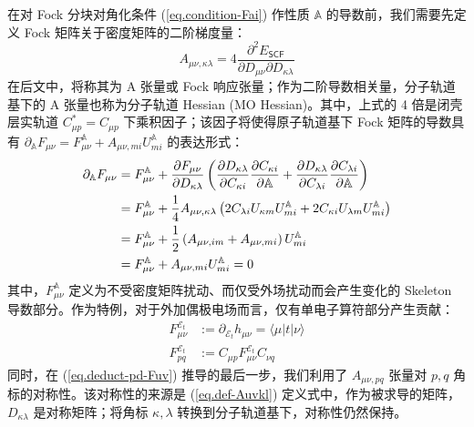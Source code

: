在对 Fock 分块对角化条件 (\ref{eq.condition-Fai}) 作性质 $\mathbb{A}$ 的导数前，我们需要先定义 Fock 矩阵关于密度矩阵的二阶梯度量：
\begin{equation}
  \label{eq.def-Auvkl}
  A_{\mu \nu, \kappa \lambda} = 4 \frac{\partial^2 E_\textsf{SCF}}{\partial D_{\mu \nu} \partial D_{\kappa \lambda}}
\end{equation}
在后文中，将称其为 A 张量或 Fock 响应张量；作为二阶导数相关量，分子轨道基下的 A 张量也称为分子轨道 Hessian (MO Hessian)。其中，上式的 4 倍是闭壳层实轨道 $C_{\mu p}^* = C_{\mu p}$ 下乘积因子；该因子将使得原子轨道基下 Fock 矩阵的导数具有 $\partial_\mathbb{A} F_{\mu \nu} = F_{\mu \nu}^\mathbb{A} + A_{\mu \nu, mi} U_{mi}^\mathbb{A}$ 的表达形式：
\begin{align}
  \label{eq.deduct-pd-Fuv}
  \partial_\mathbb{A} F_{\mu \nu} &= F_{\mu \nu}^\mathbb{A} + \frac{\partial F_{\mu \nu}}{\partial D_{\kappa \lambda}} \left( \frac{\partial D_{\kappa \lambda}}{\partial C_{\kappa i}} \frac{\partial C_{\kappa i}}{\partial \mathbb{A}} + \frac{\partial D_{\kappa \lambda}}{\partial C_{\lambda i}} \frac{\partial C_{\lambda i}}{\partial \mathbb{A}} \right) \notag\\
  &= F_{\mu \nu}^\mathbb{A} + \frac{1}{4} A_{\mu \nu, \kappa \lambda} \left( 2 C_{\lambda i} U_{\kappa m} U_{mi}^\mathbb{A} + 2 C_{\kappa i} U_{\lambda m} U_{mi}^\mathbb{A} \right) \notag\\
  &= F_{\mu \nu}^\mathbb{A} + \frac{1}{2} \left( A_{\mu \nu, im} + A_{\mu \nu, mi} \right) U_{mi}^\mathbb{A} \notag\\
  &= F_{\mu \nu}^\mathbb{A} + A_{\mu \nu, mi} U_{mi}^\mathbb{A} = 0
\end{align}
其中，$F_{\mu \nu}^\mathbb{A}$ 定义为不受密度矩阵扰动、而仅受外场扰动而会产生变化的 Skeleton 导数部分。作为特例，对于外加偶极电场而言，仅有单电子算符部分产生贡献：
\begin{align}
  F_{\mu \nu}^{\mathcal{E}_t} &:= \partial_{\mathcal{E}_t} h_{\mu \nu} = \langle \mu | t | \nu \rangle \\
  F_{pq}^{\mathcal{E}_t} &:= C_{\mu p} F_{\mu \nu}^{\mathcal{E}_t} C_{\nu q}
\end{align}
同时，在 (\ref{eq.deduct-pd-Fuv}) 推导的最后一步，我们利用了 $A_{\mu \nu, pq}$ 张量对 $p, q$ 角标的对称性。该对称性的来源是 (\ref{eq.def-Auvkl}) 定义式中，作为被求导的矩阵，$D_{\kappa \lambda}$ 是对称矩阵；将角标 $\kappa, \lambda$ 转换到分子轨道基下，对称性仍然保持。

